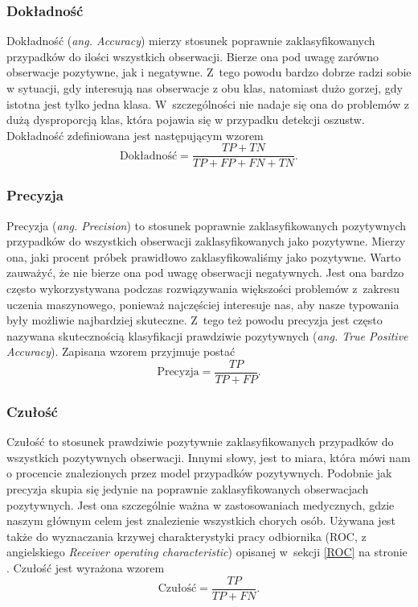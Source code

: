 \documentclass[inzynierska]{pwr_wmat_praca_dyplomowa}
\theoremstyle{plain}
\numberwithin{theorem}{chapter}
\theoremstyle{definition}
\numberwithin{theorem}{chapter}
\begin{document}
\subsubsection{Dokładność}
Dokładność (\textit{ang. Accuracy}) mierzy stosunek poprawnie zaklasyfikowanych przypadków do ilości wszystkich obserwacji. Bierze ona pod uwagę zarówno obserwacje pozytywne, jak i negatywne. Z~tego powodu bardzo dobrze radzi sobie w sytuacji, gdy interesują nas obserwacje z obu klas, natomiast dużo gorzej, gdy istotna jest tylko jedna klasa. W~szczególności nie nadaje się ona do problemów z dużą dysproporcją klas, która pojawia się w przypadku detekcji oszustw. Dokładność zdefiniowana jest następującym wzorem
$$ \text{Dokładność} = \frac{TP + TN}{TP + FP + FN + TN} \text{.}$$

\subsubsection{Precyzja}
Precyzja (\textit{ang. Precision}) to stosunek poprawnie zaklasyfikowanych pozytywnych przypadków do wszystkich obserwacji zaklasyfikowanych jako pozytywne. Mierzy ona, jaki procent próbek prawidłowo zaklasyfikowaliśmy jako pozytywne. Warto zauważyć, że nie bierze ona pod uwagę obserwacji negatywnych. Jest ona bardzo często wykorzystywana podczas rozwiązywania większości problemów z~zakresu uczenia maszynowego, ponieważ najczęściej interesuje nas, aby nasze typowania były możliwie najbardziej skuteczne. Z~tego też powodu precyzja jest często nazywana skutecznością klasyfikacji prawdziwie pozytywnych (\textit{ang. True Positive Accuracy}). Zapisana wzorem przyjmuje postać
$$ \text{Precyzja} = \frac{TP}{TP + FP} \text{.}$$

\subsubsection{Czułość}
Czułość to stosunek prawdziwie pozytywnie zaklasyfikowanych przypadków do wszystkich pozytywnych obserwacji. Innymi słowy, jest to miara, która mówi nam o procencie znalezionych przez model przypadków pozytywnych. Podobnie jak precyzja skupia się jedynie na poprawnie zaklasyfikowanych obserwacjach pozytywnych. Jest ona szczególnie ważna w zastosowaniach medycznych, gdzie naszym głównym celem jest znalezienie wszystkich chorych osób. Używana jest także do wyznaczania krzywej charakterystyki pracy odbiornika (ROC, z angielskiego \textit{Receiver operating characteristic}) opisanej w~sekcji \ref{ROC} na stronie \pageref{ROC}. Czułość jest wyrażona wzorem
$$ \text{Czułość}= \frac{TP}{TP + FN} \text{.}$$
\end{document}
